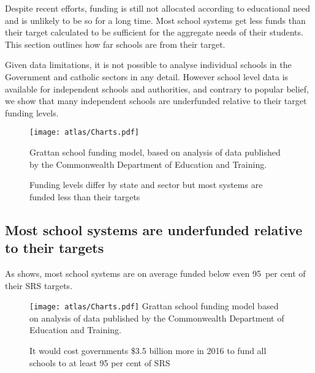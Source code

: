 \documentclass{grattan}
\begin{document}
Despite recent efforts, funding is still not allocated according to educational need and is unlikely to be so for a long time.
Most school systems get less funds than their target calculated to be sufficient for the aggregate needs of their students. This section outlines how far schools are from their target.

Given data limitations, it is not possible to analyse individual schools in the Government and catholic sectors in any detail. However school level data is available for independent schools and authorities, and contrary to popular belief, we show that many independent schools are underfunded relative to their target funding levels.


\begin{figure}[!p]
\caption{Funding levels differ by state and sector but most systems are funded less than their targets}\label{fig:funding-levels-differ-by-state-and-sector}

\texttt{[image: atlas/Charts.pdf]}

%
{Grattan school funding model, based on analysis of data published by the Commonwealth Department of Education and Training.}
\end{figure}

\subsection{Most school systems are underfunded relative to their targets}\label{subsec:most-school-systems-are-under-funded}

As  shows, most school systems are on average funded below even 95~per cent of their SRS targets.

\begin{figure}
\caption{It would cost governments \$3.5 billion more in 2016 to fund all schools to at least 95 per cent of SRS}\label{fig:cost-of-funding-all-schools-to-95-per-cent}

\texttt{[image: atlas/Charts.pdf]}
%
{Grattan school funding model based on analysis of data published by the Commonwealth Department of Education and Training.}
\end{figure}
\end{document}
